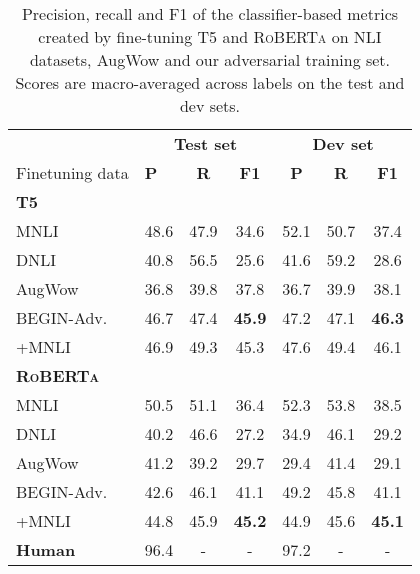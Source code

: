 \begin{table}[ht]
    \scriptsize
    \centering
    \begin{tabular}{llccccc}
    \toprule
&\multicolumn{3}{c}{\bf{    \scriptsize Test set}}&	\multicolumn{3}{c}{\bf{Dev set}} \\
   \cmidrule(lr){2-4} \cmidrule(lr){5-7} 
\scriptsize{Finetuning data}& \bf P& \bf R & \bf F1	& \bf \bf P& \bf R& \bf  F1
\\\midrule
 \textbf{\textsc{T5}}  \vspace{0.15cm}\\

 MNLI		& 48.6 & 47.9	& 34.6 & 52.1 & 50.7 & 37.4 \\
DNLI  &	40.8 &	56.5 &	25.6  &  41.6 & 59.2 & 28.6 \\
 AugWow & 36.8 & 39.8 & 37.8  & 36.7 & 39.9	& 38.1  \\
 BEGIN-Adv. & 46.7 & 47.4 &{\bf 45.9} & 47.2 & 47.1 & {\bf46.3}\\
  { \; +MNLI} &	46.9 &	49.3 & { 45.3 }& 47.6& 49.4  & 46.1 \\
\midrule
\textbf{\textsc{RoBERTa}}  \vspace{0.15cm} \\
MNLI &  50.5 & 51.1	& 36.4 & 52.3&53.8 & 38.5\\
DNLI &	40.2 & 46.6 & 27.2&34.9 &  46.1 & 29.2\\
AugWow & 41.2 & 39.2 & 29.7 & 29.4  &	41.4&	29.1 \\
 BEGIN-Adv. & 42.6& {46.1} & 41.1& 49.2&	45.8&	41.1 \\
{ \; +MNLI}	& 44.8&	{45.9}&	{\bf45.2}	& 44.9	& 45.6	&{\bf45.1}\\
\midrule
\bf Human & 96.4&- & -&97.2&- & -\\
				\bottomrule		
    \end{tabular}
    \caption{Precision, recall and F1 of the classifier-based metrics created by fine-tuning T5 and \textsc{RoBERTa} on NLI datasets, AugWow and our adversarial training set. Scores are macro-averaged across labels on the \begindata{} test and dev sets.}
    \label{tab:results}
    \vspace{-5pt}
\end{table}

